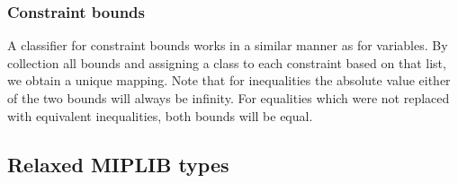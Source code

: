 				
			\subsubsection{Constraint bounds}
			
				A classifier for constraint bounds works in a similar manner as for variables.
				By collection all bounds and assigning a class to each constraint based on that list, we obtain a unique mapping.
				Note that for inequalities the absolute value either of the two bounds will always be infinity. For equalities which were not replaced with equivalent inequalities, both bounds will be equal.
				
				
				\clearpage
		
		\subsection{Relaxed MIPLIB types}
			
